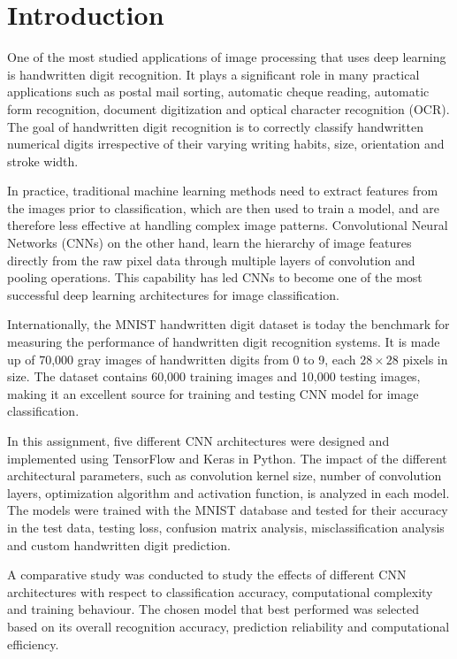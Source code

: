 
\section{Introduction}

One of the most studied applications of image processing that uses deep learning is handwritten digit recognition. It plays a significant role in many practical applications such as postal mail sorting, automatic cheque reading, automatic form recognition, document digitization and optical character recognition (OCR). The goal of handwritten digit recognition is to correctly classify handwritten numerical digits irrespective of their varying writing habits, size, orientation and stroke width.

In practice, traditional machine learning methods need to extract features from the images prior to classification, which are then used to train a model, and are therefore less effective at handling complex image patterns. Convolutional Neural Networks (CNNs) on the other hand, learn the hierarchy of image features directly from the raw pixel data through multiple layers of convolution and pooling operations. This capability has led CNNs to become one of the most successful deep learning architectures for image classification.

Internationally, the MNIST handwritten digit dataset is today the benchmark for measuring the performance of handwritten digit recognition systems. It is made up of 70,000 gray images of handwritten digits from 0 to 9, each $28 \times 28$ pixels in size. The dataset contains 60,000 training images and 10,000 testing images, making it an excellent source for training and testing CNN model for image classification.

In this assignment, five different CNN architectures were designed and implemented using TensorFlow and Keras in Python. The impact of the different architectural parameters, such as convolution kernel size, number of convolution layers, optimization algorithm and activation function, is analyzed in each model. The models were trained with the MNIST database and tested for their accuracy in the test data, testing loss, confusion matrix analysis, misclassification analysis and custom handwritten digit prediction.

A comparative study was conducted to study the effects of different CNN architectures with respect to classification accuracy, computational complexity and training behaviour. The chosen model that best performed was selected based on its overall recognition accuracy, prediction reliability and computational efficiency.

